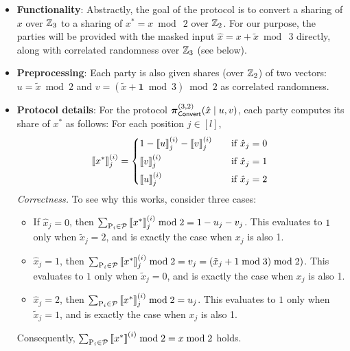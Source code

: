 \begin{itemize}
  \item \textbf{Functionality}: Abstractly, the goal of the protocol is to convert a sharing of $x$ over $\mathbb{Z}_3$ to a sharing of $x^* = x \bmod~2$ over $\mathbb{Z}_2$. For our purpose, the parties will be provided with the masked input $\hat{x} = x + \tilde{x} \bmod~3$ directly, along with correlated randomness over $\mathbb{Z}_3$ (see below).

  \item \textbf{Preprocessing}: Each party is also given shares (over $\mathbb{Z}_2$) of two vectors: $u = \tilde{x} \bmod 2$ and $v = (\tilde{x} + \textbf{1} \bmod 3) \bmod 2$ as correlated randomness.


  \item \textbf{Protocol details}: For the protocol $\boldsymbol{\pi}_{\textnormal{\textsf{Convert}}}^{(3,2)}(\hat{x} \mid u, v)$, each party computes its share of $x^*$ as follows: For each position $j \in [l]$,
\[
\sharei{x^*}_j = 
\begin{cases*}
       1 - \sharei{u}_j - \sharei{v}_j  & \quad if $\hat{x}_j = 0$ \\
       \sharei{v}_j & \quad if $\hat{x}_j = 1$ \\
       \sharei{u}_j & \quad if $\hat{x}_j = 2$
\end{cases*}
\]
\iffull
\textit{Correctness.} To see why this works, consider three cases:
\begin{itemize}
\item If $\hat{x}_j = 0$, then $\sum_{\textnormal{P}_i \in \mathcal{P}} \left\llbracket x^* \right\rrbracket^{(i)}_j \bmod 2 = 1 - u_j - v_j$. This evaluates to $1$ only when $\tilde{x}_j = 2$, and is exactly the case when $x_j$ is also 1.

\item $\hat{x}_j = 1$, then $\sum_{\textnormal{P}_i \in \mathcal{P}} \left\llbracket x^* \right\rrbracket^{(i)}_j \bmod 2 = v_j = (\tilde{x}_j + 1 \bmod 3) \bmod 2)$. This evaluates to $1$ only when $\tilde{x}_j = 0$, and is exactly the case when $x_j$ is also 1.

\item $\hat{x}_j = 2$, then $\sum_{\textnormal{P}_i \in \mathcal{P}} \left\llbracket x^* \right\rrbracket^{(i)}_j \bmod 2 = u_j$. This evaluates to $1$ only when $\tilde{x}_j = 1$, and is exactly the case when $x_j$ is also 1.
\end{itemize}
Consequently, $\sum_{\textnormal{P}_i \in \mathcal{P}} \left\llbracket x^* \right\rrbracket^{(i)} \bmod 2 = x \bmod 2$ holds.
\fi
\end{itemize}

\iffull
